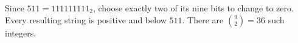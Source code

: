 Since $511=111111111_2$, choose exactly two of its nine bits to change to zero. Every resulting string is positive and below $511$. There are $\boxed{\binom92=36}$ such integers.
